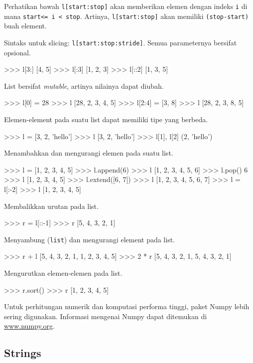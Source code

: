 \documentclass[a4paper,11pt]{extarticle}
\begin{document}
Perhatikan bawah \texttt{l[start:stop]} akan memberikan
elemen dengan indeks \texttt{i} di mana \texttt{start<= i < stop}.
Artinya, \texttt{l[start:stop]} akan memiliki
\texttt{(stop-start)} buah element.

Sintaks untuk slicing: \texttt{l[start:stop:stride]}.
Semua parameternya bersifat opsional.
\begin{pyconcode}
>>> l[3:]
[4, 5]
>>> l[:3]
[1, 2, 3]
>>> l[::2]
[1, 3, 5]
\end{pyconcode}

List bersifat \textit{mutable}, artinya nilainya dapat diubah.
\begin{pyconcode}
>>> l[0] = 28
>>> l
[28, 2, 3, 4, 5]
>>> l[2:4] = [3, 8] 
>>> l
[28, 2, 3, 8, 5]
\end{pyconcode}

Elemen-element pada suatu list dapat memiliki tipe yang berbeda.
\begin{pyconcode}
>>> l = [3, 2, 'hello']
>>> l
[3, 2, 'hello']
>>> l[1], l[2]
(2, 'hello')
\end{pyconcode}

Menambahkan dan mengurangi elemen pada suatu list.
\begin{pyconcode}
>>> l = [1, 2, 3, 4, 5]
>>> l.append(6)
>>> l
[1, 2, 3, 4, 5, 6]
>>> l.pop()
6
>>> l
[1, 2, 3, 4, 5]
>>> l.extend([6, 7])
>>> l
[1, 2, 3, 4, 5, 6, 7]
>>> l = l[:-2]
>>> l
[1, 2, 3, 4, 5]
\end{pyconcode}

Membalikkan urutan pada list.
\begin{pyconcode}
>>> r = l[::-1]
>>> r
[5, 4, 3, 2, 1]
\end{pyconcode}

Menyambung (\texttt{list}) dan mengurangi element pada list.
\begin{pyconcode}
>>> r + l
[5, 4, 3, 2, 1, 1, 2, 3, 4, 5]
>>> 2 * r
[5, 4, 3, 2, 1, 5, 4, 3, 2, 1]
\end{pyconcode}

Mengurutkan elemen-elemen pada list.
\begin{pyconcode}
>>> r.sort()
>>> r
[1, 2, 3, 4, 5]
\end{pyconcode}


Untuk perhitungan numerik dan komputasi performa tinggi, paket
\textsf{Numpy} lebih sering digunakan. Informasi mengenai \textsf{Numpy}
dapat ditemukan di \url{www.numpy.org}.


\subsection{Strings}
\end{document}
